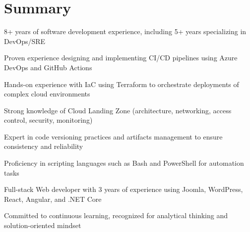 \documentclass[]{deedy-resume-openfont}
\begin{document}
    
%
%
%
%
\sectionsep
\sectionsep
\section{Summary}
\vspace{5pt}
\begin{tightemize}
	\item 8+ years of software development experience, including 5+ years specializing in DevOps/SRE
	\item Proven experience designing and implementing CI/CD pipelines using Azure DevOps and GitHub Actions
	\item Hands-on experience with IaC using Terraform to orchestrate deployments of complex cloud environments
	\item Strong knowledge of Cloud Landing Zone (architecture, networking, access control, security, monitoring)
	\item Expert in code versioning practices and artifacts management to ensure consistency and reliability
	\item Proficiency in scripting languages such as Bash and PowerShell for automation tasks
	\item Full-stack Web developer with 3 years of experience using Joomla, WordPress, React, Angular, and .NET Core
	\item Committed to continuous learning, recognized for analytical thinking and solution-oriented mindset
\end{tightemize}
%
%
\end{document}
